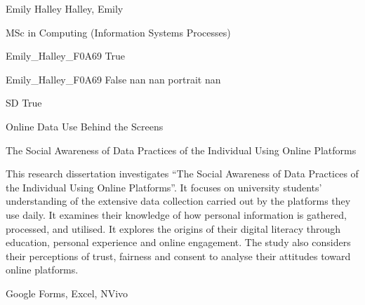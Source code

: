 
\begingroup{}\relax



\def\Key{Emily_Halley_F0A69}

{Emily Halley}
{Halley, Emily}

{MSc in Computing (Information Systems Processes)}

{Emily_Halley_F0A69}
{True}

{Emily_Halley_F0A69}
{False}
{nan}
{nan}
{portrait}
{nan}

{SD}
{True}

{Online Data Use Behind the Screens}

{The Social Awareness of Data Practices of the Individual Using Online Platforms}

{This research dissertation investigates \textquotedblleft{}The Social Awareness of Data Practices of the Individual Using Online Platforms\textquotedblright{}. It focuses on university students' understanding of the extensive data collection carried out by the platforms they use daily. It examines their knowledge of how personal information is gathered, processed, and utilised. It explores the origins of their digital literacy through education, personal experience and online engagement. The study also considers their perceptions of trust, fairness and consent to analyse their attitudes toward online platforms.}

{Google Forms, Excel, NVivo}

